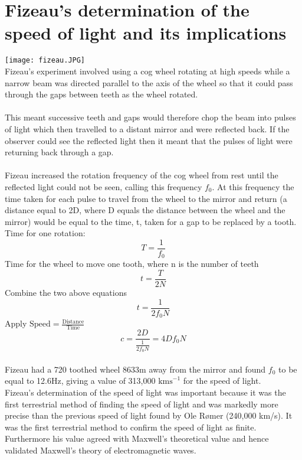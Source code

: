 \documentclass[12pt]{article}
\begin{document}
\section{Fizeau's determination of the speed of light and its implications}
\texttt{[image: fizeau.JPG]}\\
Fizeau’s experiment involved using a cog wheel rotating at high speeds while a narrow beam was directed parallel to the axis of the wheel so that it could pass through the gaps between teeth as the wheel rotated.\\
\\
This meant successive teeth and gaps would therefore chop the beam into pulses of light which then travelled to a distant mirror and were reflected back. If the observer could see the reflected light then it meant that the pulses of light were returning back through a gap.\\
\\
Fizeau increased the rotation frequency of the cog wheel from rest until the reflected light could not be seen, calling this frequency $f_0$. At this frequency the time taken for each pulse to travel from the wheel to the mirror and return (a distance equal to 2D, where D equals the distance between the wheel and the mirror) would be equal to the time, t, taken for a gap to be replaced by a tooth.
\newpage
Time for one rotation:
$$T=\frac{1}{f_0}$$
Time for the wheel to move one tooth, where n is the number of teeth
$$t=\frac{T}{2N}$$
Combine the two above equations
$$t=\frac{1}{2f_0N}$$
Apply $\textrm{Speed}=\frac{\textrm{Distance}}{\textrm{Time}}$
$$c=\frac{2D}{\frac{1}{2f_0N}}=4Df_0N$$
\\
Fizeau had a 720 toothed wheel 8633m away from the mirror and found $f_0$ to be equal to 12.6Hz, giving a value of 313,000 $\textrm{kms}^{-1}$ for the speed of light.\\
Fizeau’s determination of the speed of light was important because it was the first terrestrial method of finding the speed of light and was markedly more precise than the previous speed of light found by Ole Rømer (240,000 km/s). It was the first terrestrial method to confirm the speed of light as finite. Furthermore his value agreed with Maxwell’s theoretical value and hence validated Maxwell’s theory of electromagnetic waves.
\end{document}
